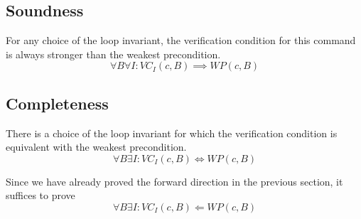 \documentclass{article}
\begin{document}
\subsection{Soundness}
For any choice of the loop invariant, the verification condition for this
command is always stronger than the weakest precondition.
\[
\forall B \forall I : VC_I(c, B) \implies WP(c, B)
\]

\subsection{Completeness}
There is a choice of the loop invariant for which the verification condition is
equivalent with the weakest precondition.
\[
\forall B \exists I : VC_I(c, B) \Leftrightarrow WP(c, B)
\]

Since we have already proved the forward direction in the previous section, it suffices to prove
\[
\forall B \exists I : VC_I(c, B) \Leftarrow WP(c, B)
\]
\end{document}
